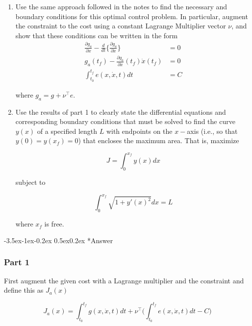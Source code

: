\documentclass[11pt,letterpaper,onecolumn,notitlepage]{article}
\makeatletter
\renewcommand\subsection{\@startsection{subsection}{1}{\z@}%
{-3.5ex\@plus-1ex\@minus-0.2ex}%
{0.5ex\@plus0.2ex}%
{\fontsize{10pt}{10pt}\selectfont\bfseries\sffamily}}
\makeatother
\begin{document}
\begin{enumerate}
  \item{%
    Use the same approach followed in the notes to find the necessary and boundary conditions for this optimal control problem.
    In particular, augment the constraint to the cost using a constant Lagrange Multiplier vector $\nu$, and show that these conditions can be written in the form
  }
  \begin{align*}
    \frac{\partial{}g_{a}}{\partial{}x}-\frac{d}{dt}\biggr\{\frac{\partial{}g_{a}}{\partial\dot{x}}\biggr\}&=0 \\
    g_{a}(t_{f})-\frac{\partial{}g_{a}}{\partial\dot{x}}(t_{f})\dot{x}(t_{f})&=0 \\
    \int_{t_{0}}^{t_{f}}e(x,\dot{x},t)dt&=C
  \end{align*}

  where $g_{a}=g+\nu^{\top}e$.

  \item{%
    Use the results of part 1 to clearly state the differential equations and corresponding boundary conditions that must be solved to find the curve $y(x)$ of a specified length $L$ with endpoints on the $x-$axis (i.e., so that $y(0)=y(x_{f})=0$) that encloses the maximum area.
    That is, maximize
  }

  \begin{equation*}
    J=\int_{0}^{x_{f}}y(x)dx
  \end{equation*}

  subject to

  \begin{equation*}
    \int_{0}^{x_{f}}\sqrt{1+y'(x)^{2}}dx=L
  \end{equation*}

  where $x_{f}$ is free.
\end{enumerate}

\subsection*{Answer}
\subsubsection*{Part 1}

First augment the given cost with a Lagrange multiplier and the constraint and define this as $J_{a}(x)$

\begin{equation*}
  J_{a}(x)=\int_{t_{0}}^{t_{f}}g(x,\dot{x},t)dt+\nu^{\top}\biggr(\int_{t_{0}}^{t_{f}}e(x,\dot{x},t)dt-C\biggr)
\end{equation*}
\end{document}
